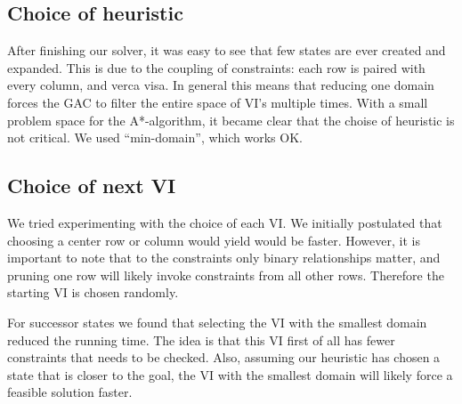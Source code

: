 \documentclass[journal]{IEEEtran}
\begin{document}
\subsection{Choice of heuristic}
After finishing our solver, it was easy to see that few states are ever created and
expanded. This is due to the coupling of constraints: each row is paired
with every column, and verca visa. In general this means that reducing one domain forces
the GAC to filter the entire space of VI's multiple times.
With a small problem space for the A*-algorithm, it became clear that the
choise of heuristic is not critical. We used ``min-domain'', which works OK.

\subsection{Choice of next VI}
We tried experimenting with the choice of each VI. We initially postulated that
choosing a center row or column would yield would be faster. However, it is
important to note that to the constraints only binary relationships matter,
and pruning one row will likely invoke constraints from all other rows.
Therefore the starting VI is chosen randomly.

For successor states we found that selecting the VI with the smallest domain
reduced the running time. The idea is that this VI first of all has fewer
constraints that needs to be checked. Also, assuming our heuristic has chosen
a state that is closer to the goal, the VI with the smallest domain will likely
force a feasible solution faster.
\end{document}

